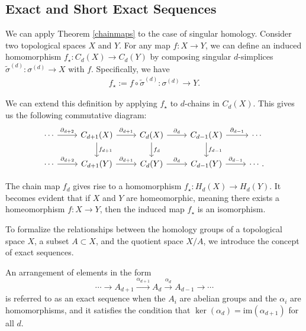 \subsection{Exact and Short Exact Sequences}
\label{ExactandShortExactSequences}
We can apply Theorem \ref{chainmaps} to the case of singular homology. Consider two topological spaces \( X \) and \( Y \). For any map \( f: X \rightarrow Y \), we can define an induced homomorphism \( f_{\star}: C_{d}(X) \rightarrow C_{d}(Y) \) by composing singular \( d \)-simplices \( \tilde{\sigma}^{(d)}: \sigma^{(d)} \rightarrow X \) with \( f \). Specifically, we have
\begin{align}
	f_{\star} := f \circ \tilde{\sigma}^{(d)}: \sigma^{(d)} \rightarrow Y. 
\end{align}

We can extend this definition by applying \( f_{\star} \) to \( d \)-chains in \( C_{d}(X) \). This gives us the following commutative diagram:
\begin{equation}
	\begin{tikzcd}
		\cdots \arrow[r, "\partial_{d+2}"] & C_{d+1}(X) \arrow[r, "\partial_{d+1}"] \arrow[d, "f_{d+1}"] & C_d(X) \arrow[r, "\partial_d"] \arrow[d, "f_d"] & C_{d-1}(X) \arrow[r, "\partial_{d-1}"] \arrow[d, "f_{d-1}"] & \cdots \\ 
		\cdots \arrow[r, "\partial_{d+2}"] & C_{d+1}(Y) \arrow[r, "\partial_{d+1}"] & C_d(Y) \arrow[r, "\partial_d"] & C_{d-1}(Y) \arrow[r, "\partial_{d-1}"] & \cdots.
	\end{tikzcd}
\end{equation}

The chain map \( f_{d} \) gives rise to a homomorphism \( f_{\star}: H_{d}(X) \rightarrow H_{d}(Y) \). It becomes evident that if \( X \) and \( Y \) are homeomorphic, meaning there exists a homeomorphism \( f: X \rightarrow Y \), then the induced map \( f_{\star} \) is an isomorphism.

To formalize the relationships between the homology groups of a topological space \( X \), a subset \( A \subset X \), and the quotient space \( X/A \), we introduce the concept of exact sequences.

\begin{definition}
	An arrangement of elements in the form
	\begin{equation}
		\cdots \rightarrow A_{d+1}\xrightarrow{\alpha_{d+1}}A_{d}\xrightarrow{\alpha_d} A_{d-1}\xrightarrow{}\cdots
	\end{equation}
	is referred to as an exact sequence when the \( A_{i} \) are abelian groups and the \( \alpha_{i} \) are homomorphisms, and it satisfies the condition that \( \ker(\alpha_{d}) = \mathrm{im}(\alpha_{d+1}) \) for all \( d \).
\end{definition}

